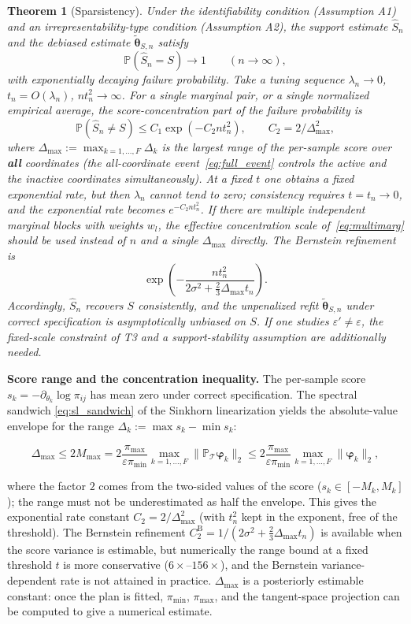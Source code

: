 \documentclass[11pt,a4paper]{article}
\newtheorem{theorem}{Theorem}[section]
\theoremstyle{remark}
\renewcommand{\phi}{\bm{\varphi}}
\begin{document}
\begin{theorem}[Sparsistency]\label{thm:T2}
Under the identifiability condition (Assumption A1) and an irrepresentability-type
condition (Assumption A2), the support estimate $\widehat S_n$ and the debiased estimate
$\widetilde{\bm{\theta}}_{S,n}$ satisfy
\[
\mathbb{P}(\widehat S_n=S)\to1\qquad(n\to\infty),
\]
with exponentially decaying failure probability. Take a tuning sequence $\lambda_n\to0$,
$t_n=O(\lambda_n)$, $n t_n^2\to\infty$. For a single marginal pair, or a single normalized
empirical average, the score-concentration part of the failure probability is
\[
\mathbb{P}(\widehat S_n\ne S)\le C_1\exp(-C_2 n t_n^2),
\qquad C_2=2/\Delta_{\max}^2,
\]
where $\Delta_{\max}:=\max_{k=1,\dots,F}\Delta_k$ is the largest range of the per-sample
score over \textbf{all} coordinates (the all-coordinate event~\eqref{eq:full_event}
controls the active and the inactive coordinates simultaneously). At a fixed $t$ one
obtains a fixed exponential rate, but then $\lambda_n$ cannot tend to zero; consistency
requires $t=t_n\to0$, and the exponential rate becomes $e^{-C_2 n t_n^2}$. If there are
multiple independent marginal blocks with weights $w_l$, the effective concentration scale
of~\eqref{eq:multimarg} should be used instead of $n$ and a single $\Delta_{\max}$
directly. The Bernstein refinement is
\[
\exp\left(-\frac{n t_n^2}{2\sigma^2+\frac{2}{3}\Delta_{\max}t_n}\right).
\]
Accordingly, $\widehat S_n$ recovers $S$ consistently, and the unpenalized refit
$\widetilde{\bm{\theta}}_{S,n}$ under correct specification is asymptotically unbiased on
$S$. If one studies $\varepsilon'\ne\varepsilon$, the fixed-scale constraint of T3 and a
support-stability assumption are additionally needed.
\end{theorem}

\textbf{Score range and the concentration inequality.} The per-sample score
$s_k=-\partial_{\theta_k}\log\pi_{ij}$ has mean zero under correct specification. The
spectral sandwich \eqref{eq:sl_sandwich} of the Sinkhorn linearization yields the
absolute-value envelope for the range $\Delta_k:=\max s_k-\min s_k$:

\[
\Delta_{\max}\le 2M_{\max}=2\frac{\pi_{\max}}{\varepsilon\pi_{\min}}\max_{k=1,\dots,F}\|\mathbb{P}_{\mathcal{T}}\phi_k\|_2\le 2\frac{\pi_{\max}}{\varepsilon\pi_{\min}}\max_{k=1,\dots,F}\|\phi_k\|_2,
\]

where the factor $2$ comes from the two-sided values of the score
($s_k\in[-M_k,M_k]$); the range must not be underestimated as half the envelope. This gives
the exponential rate constant $C_2=2/\Delta_{\max}^2$ (with $t_n^2$ kept in the exponent,
free of the threshold). The Bernstein refinement
$C_2^{\mathrm{B}}=1/(2\sigma^2+\frac{2}{3}\Delta_{\max}t_n)$ is available when the score
variance is estimable, but numerically the range bound at a fixed threshold $t$ is more
conservative ($6\times$--$156\times$), and the Bernstein variance-dependent rate is not attained in practice.
$\Delta_{\max}$ is a posteriorly estimable constant: once the plan is fitted, $\pi_{\min}$,
$\pi_{\max}$, and the tangent-space projection can be computed to give a numerical
estimate.
\end{document}
